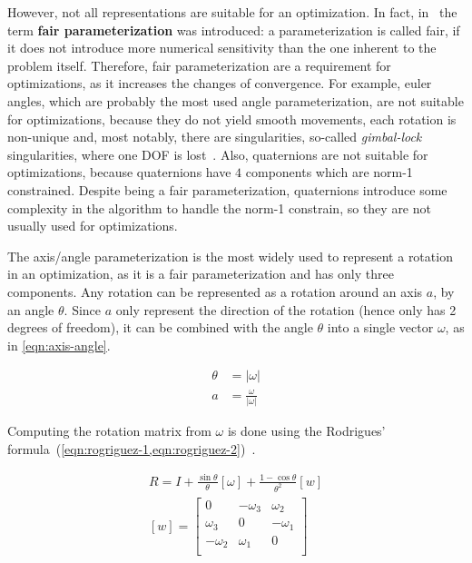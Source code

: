 However, not all representations are suitable for an optimization. In fact, in~\cite{hornegger99} the term \textbf{fair parameterization} was introduced: a parameterization is called fair, if it does not introduce more numerical sensitivity than the one inherent to the problem itself. Therefore, fair parameterization are a requirement for optimizations, as it increases the changes of convergence. For example, euler angles, which are probably the most used angle parameterization, are not suitable for optimizations, because they do not yield smooth movements, each rotation is non-unique and, most notably, there are singularities, so-called \textit{gimbal-lock} singularities, where one DOF is lost~\cite{schmidt01}. Also, quaternions are not suitable for optimizations, because quaternions have $4$ components which are norm-1 constrained. Despite being a fair parameterization, quaternions introduce some complexity in the algorithm to handle the norm-1 constrain, so they are not usually used for optimizations.

The axis/angle parameterization is the most widely used to represent a rotation in an optimization, as it is a fair parameterization and has only three components. Any rotation can be represented as a rotation around an axis $a$, by an angle $\theta$. Since $a$ only represent the direction of the rotation (hence only has 2 degrees of freedom), it can be combined with the angle $\theta$ into a single vector $\omega$, as in \cref{eqn:axis-angle}.

\begin{equation}
    \label{eqn:axis-angle}
    \begin{aligned}
        \theta & = |\omega| \\
        a & = \frac{\omega}{|\omega|}
    \end{aligned}
\end{equation}

Computing the rotation matrix from $\omega$ is done using the Rodrigues' formula~(\cref{eqn:rogriguez-1,eqn:rogriguez-2})~\cite{schmidt01}.

\begin{align}
    \label{eqn:rogriguez-1}
    R = I + \frac{\sin \theta}{\theta} [\omega] + \frac{1 - \cos \theta}{\theta^2} [w] \\
    \label{eqn:rogriguez-2}
    [w] = \left[
        \begin{array}{ccc}
            0  & -\omega_3 & \omega_2 \\
            \omega_3 & 0   & -\omega_1 \\
            -\omega_2 & \omega_1 & 0 \\
        \end{array}
    \right]
\end{align}

